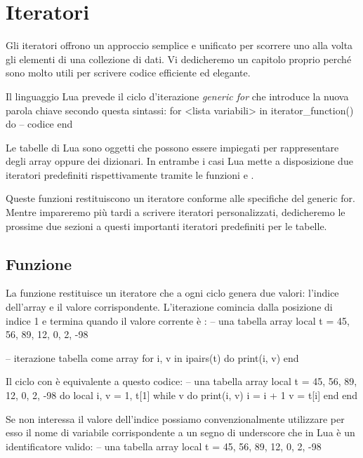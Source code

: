 
\chapter{Iteratori}

Gli iteratori offrono un approccio semplice e unificato per scorrere uno alla
volta gli elementi di una collezione di dati. Vi dedicheremo un capitolo proprio
perché sono molto utili per scrivere codice efficiente ed elegante.

Il linguaggio Lua prevede il ciclo d'iterazione \emph{generic for} che
introduce la nuova parola chiave  secondo questa sintassi:
\lines
for <lista variabili> in iterator_function() do
-- codice
end
\endlines
{}

Le tabelle di Lua sono oggetti che possono essere impiegati per rappresentare
degli array oppure dei dizionari. In entrambe i casi Lua mette a disposizione
due iteratori predefiniti rispettivamente tramite le funzioni  e
.

Queste funzioni restituiscono un iteratore conforme alle specifiche del generic
for. Mentre impareremo più tardi a scrivere iteratori personalizzati,
dedicheremo le prossime due sezioni a questi importanti iteratori predefiniti
per le tabelle.


\section{Funzione }

La funzione  restituisce un iteratore che a ogni ciclo genera due
valori: l'indice dell'array e il valore corrispondente. L'iterazione comincia
dalla posizione di indice 1 e termina quando il valore corrente è :
\lines
-- una tabella array
local t = {45, 56, 89, 12, 0, 2, -98}

-- iterazione tabella come array
for i, v in ipairs(t) do
    print(i, v)
end
\endlines
{}

Il ciclo con  è equivalente a questo codice:
\lines
-- una tabella array
local t = {45, 56, 89, 12, 0, 2, -98}
do
    local i, v = 1, t[1]
    while v do
        print(i, v)
        i = i + 1
        v = t[i]
    end
end
\endlines
{}

Se non interessa il valore dell'indice possiamo convenzionalmente utilizzare
per esso il nome di variabile corrispondente a un segno di underscore che in
Lua è un identificatore valido:
\lines
-- una tabella array
local t = {45, 56, 89, 12, 0, 2, -98}

